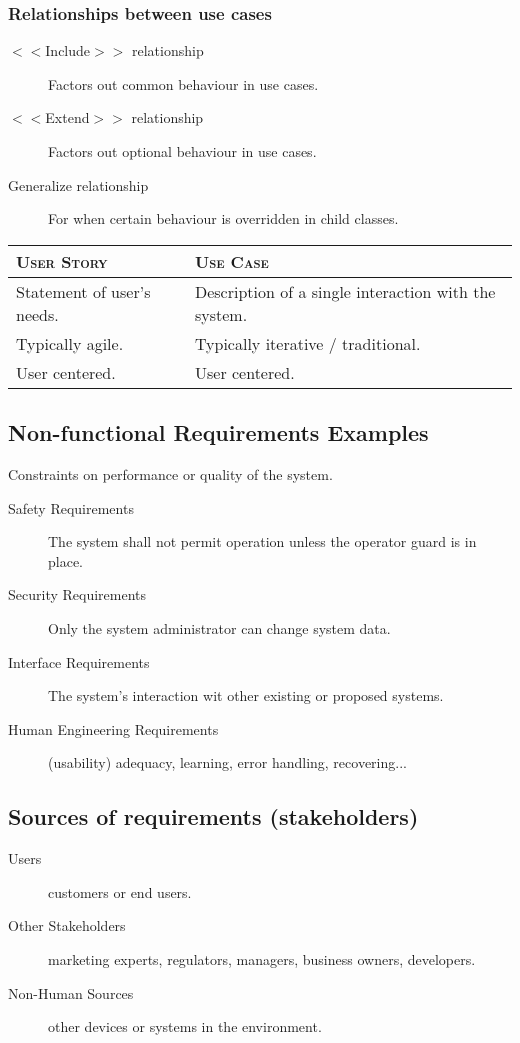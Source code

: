 \documentclass[landscape]{cheat}
\begin{document}
\begin{multicols}{3}
\subsubsection{Relationships between use cases}
\begin{description}
    \item[$<<$Include$>>$ relationship] Factors out common behaviour in use cases.
    \item[$<<$Extend$>>$ relationship] Factors out optional behaviour in use cases.
    \item[Generalize relationship] For when certain behaviour is overridden in child classes.
\end{description}

\begin{tabular}{|p{3.5cm}|p{3.5cm}|}
\hline
    \textsc{User Story} & \textsc{Use Case} \\ \hline
    Statement of user's needs. & Description of a single interaction with the system. \\ \hline
    Typically agile. & Typically iterative / traditional. \\ \hline
    User centered. & User centered. \\ \hline
\end{tabular}

\subsection{Non-functional Requirements Examples}
Constraints on performance or quality of the system.
\begin{description}
    \item[Safety Requirements] The system shall not permit operation unless the operator guard is in place.
    \item[Security Requirements] Only the system administrator can change system data.
    \item[Interface Requirements] The system's interaction wit other existing or proposed systems.
    \item[Human Engineering Requirements] (usability) adequacy, learning, error handling, recovering...
\end{description}

\subsection{Sources of requirements (stakeholders)}
\begin{description}
    \item[Users] customers or end users.
    \item[Other Stakeholders] marketing experts, regulators, managers, business owners, developers.
    \item[Non-Human Sources] other devices or systems in the environment.
\end{description}


\end{multicols}
\end{document}
